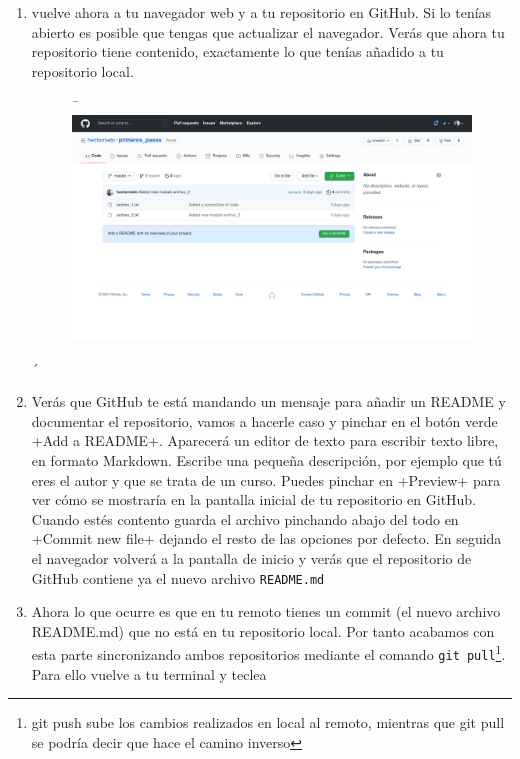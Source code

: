 \documentclass[a5paper,10pt]{article}
\begin{document}
\begin{enumerate}
      \item vuelve ahora a tu navegador web y a tu repositorio en GitHub. Si lo tenías abierto es posible que tengas que actualizar el navegador. Verás que ahora tu repositorio tiene contenido, exactamente lo que tenías añadido a tu repositorio local.
      
      \begin{figure}[H]¯
       \includegraphics[width=\textwidth]{github_add_readme}
      \end{figure}´
      
      \item Verás que GitHub te está mandando un mensaje para añadir un README y documentar el repositorio, vamos a hacerle caso y pinchar en el botón verde \cverb+Add a README+. Aparecerá un editor de texto para escribir texto libre, en formato Markdown. Escribe una pequeña descripción, por ejemplo que tú eres el autor y que se trata de un curso. Puedes pinchar en \cverb+Preview+ para ver cómo se mostraría en la pantalla inicial de tu repositorio en GitHub. Cuando estés contento guarda el archivo pinchando abajo del todo en \cverb+Commit new file+ dejando el resto de las opciones por defecto. En seguida el navegador volverá a la pantalla de inicio y verás que el repositorio de GitHub contiene ya el nuevo archivo \verb+README.md+
      
      \item Ahora lo que ocurre es que en tu remoto tienes un commit (el nuevo archivo README.md) que no está en tu repositorio local. Por tanto acabamos con esta parte sincronizando ambos repositorios mediante el comando \verb+git pull+\footnote{git push sube los cambios realizados en local al remoto, mientras que git pull se podría decir que hace el camino inverso}. Para ello vuelve a tu terminal y teclea 
      

\end{enumerate}
\end{document}
